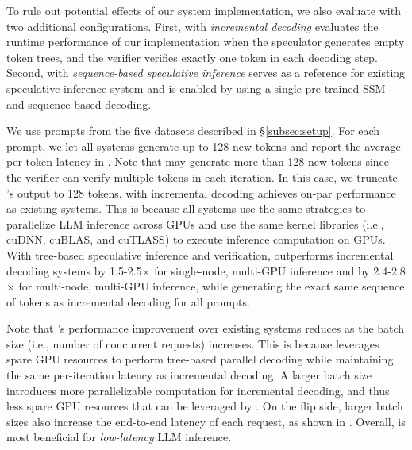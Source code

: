 To rule out potential effects of our system implementation, we also evaluate \Sys with two additional configurations. First, \sys with {\em incremental decoding} evaluates the runtime performance of our implementation when the speculator generates empty token trees, and the verifier verifies exactly one token in each decoding step.
Second, \sys with {\em sequence-based speculative inference} serves as a reference for existing speculative inference system and is enabled by using a single pre-trained SSM and sequence-based decoding.

We use prompts from the five datasets described in \S\ref{subsec:setup}. For each prompt, we let all systems generate up to 128 new tokens and report the average per-token latency in .
Note that \Sys may generate more than 128 new tokens since the verifier can verify multiple tokens in each iteration. 
In this case, we truncate \Sys's output to 128 tokens.
\Sys with incremental decoding achieves on-par performance as existing  systems. This is because all systems use the same strategies to parallelize LLM inference across GPUs and use the same kernel libraries (i.e., cuDNN, cuBLAS, and cuTLASS) to execute inference computation on GPUs.
With tree-based speculative inference and verification, \Sys outperforms incremental decoding systems by 1.5-2.5$\times$ for single-node, multi-GPU inference and by 2.4-2.8$\times$ for multi-node, multi-GPU inference, while generating the exact same sequence of tokens as incremental decoding for all prompts.



\iffinal
Note that \sys's performance improvement over existing systems reduces as the batch size (i.e., number of concurrent requests) increases.
This is because \sys leverages spare GPU resources to perform tree-based parallel decoding while maintaining the same per-iteration latency as incremental decoding.
A larger batch size introduces more parallelizable computation for incremental decoding, and thus less spare GPU resources that can be leveraged by \sys.
On the flip side, larger batch sizes also increase the end-to-end latency of each request, as shown in .
Overall, \sys is most beneficial for {\em low-latency} LLM inference.
\fi 

